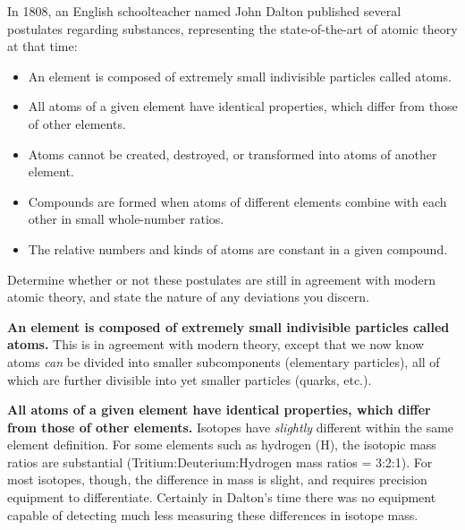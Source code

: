 

In 1808, an English schoolteacher named John Dalton published several postulates regarding substances, representing the state-of-the-art of atomic theory at that time:

\begin{itemize}
\item{} An element is composed of extremely small indivisible particles called atoms.
\item{} All atoms of a given element have identical properties, which differ from those of other elements.
\item{} Atoms cannot be created, destroyed, or transformed into atoms of another element.
\item{} Compounds are formed when atoms of different elements combine with each other in small whole-number ratios.
\item{} The relative numbers and kinds of atoms are constant in a given compound.
\end{itemize} 

Determine whether or not these postulates are still in agreement with modern atomic theory, and state the nature of any deviations you discern.







{\bf An element is composed of extremely small indivisible particles called atoms.}  This is in agreement with modern theory, except that we now know atoms {\it can} be divided into smaller subcomponents (elementary particles), all of which are further divisible into yet smaller particles (quarks, etc.).

\vskip 10pt

{\bf All atoms of a given element have identical properties, which differ from those of other elements.}  Isotopes have {\it slightly} different within the same element definition.  For some elements such as hydrogen (H), the isotopic mass ratios are substantial (Tritium:Deuterium:Hydrogen mass ratios = 3:2:1).  For most isotopes, though, the difference in mass is slight, and requires precision equipment to differentiate.  Certainly in Dalton's time there was no equipment capable of detecting much less measuring these differences in isotope mass.

